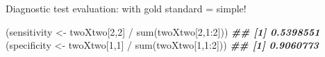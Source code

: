 \documentclass[
  ignorenonframetext,
  aspectratio=169,
]{beamer}
\newenvironment{Shaded}{\begin{snugshade}}{\end{snugshade}}
\newcommand{\DecValTok}[1]{\textcolor[rgb]{0.00,0.00,0.81}{#1}}
\newcommand{\DocumentationTok}[1]{\textcolor[rgb]{0.56,0.35,0.01}{\textbf{\textit{#1}}}}
\newcommand{\FunctionTok}[1]{\textcolor[rgb]{0.00,0.00,0.00}{#1}}
\newcommand{\NormalTok}[1]{#1}
\newcommand{\OtherTok}[1]{\textcolor[rgb]{0.56,0.35,0.01}{#1}}
\newcommand{\SpecialCharTok}[1]{\textcolor[rgb]{0.00,0.00,0.00}{#1}}
\begin{document}
\begin{frame}[fragile]{Diagnostic test evaluation: with gold standard =
simple!}
\normalsize

\pause

\scriptsize

\begin{Shaded}
\begin{Highlighting}[]
\NormalTok{(sensitivity }\OtherTok{\textless{}{-}}\NormalTok{ twoXtwo[}\DecValTok{2}\NormalTok{,}\DecValTok{2}\NormalTok{] }\SpecialCharTok{/} \FunctionTok{sum}\NormalTok{(twoXtwo[}\DecValTok{2}\NormalTok{,}\DecValTok{1}\SpecialCharTok{:}\DecValTok{2}\NormalTok{]))}
\DocumentationTok{\#\# [1] 0.5398551}
\NormalTok{(specificity }\OtherTok{\textless{}{-}}\NormalTok{ twoXtwo[}\DecValTok{1}\NormalTok{,}\DecValTok{1}\NormalTok{] }\SpecialCharTok{/} \FunctionTok{sum}\NormalTok{(twoXtwo[}\DecValTok{1}\NormalTok{,}\DecValTok{1}\SpecialCharTok{:}\DecValTok{2}\NormalTok{]))}
\DocumentationTok{\#\# [1] 0.9060773}
\end{Highlighting}
\end{Shaded}

\normalsize
\end{frame}
\end{document}
